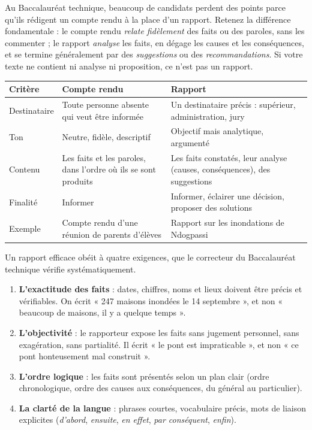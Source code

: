 \documentclass[11pt]{article}
\newcommand{\cle}[1]{{\popxbold\color{popdark}#1}}
\newcounter{popsec}
\newcounter{popsub}
\newcommand{\courssub}[1]{%
  \stepcounter{popsub}%
  \par\vspace{9pt}\noindent{\popxbold\fontsize{11.5}{13}\selectfont\color{popink}{\color{poporange}\thepopsec.\thepopsub}\hspace{6pt}#1}\par\nopagebreak\vspace{4pt}
}
\begin{document}
\begin{attention}
Au Baccalauréat technique, beaucoup de candidats perdent des points parce qu'ils rédigent un compte rendu à la place d'un rapport. Retenez la différence fondamentale : le \cle{compte rendu} \emph{relate fidèlement} des faits ou des paroles, sans les commenter ; le \cle{rapport} \emph{analyse} les faits, en dégage les causes et les conséquences, et se termine généralement par des \emph{suggestions} ou des \emph{recommandations}. Si votre texte ne contient ni analyse ni proposition, ce n'est pas un rapport.
\end{attention}

\begin{center}
\begin{tabularx}{\linewidth}{|l|X|X|}\hline
\rowcolor{popblueL} \textbf{Critère} & \textbf{Compte rendu} & \textbf{Rapport} \\ \hline
Destinataire & Toute personne absente qui veut être informée & Un destinataire précis : supérieur, administration, jury \\ \hline
Ton & Neutre, fidèle, descriptif & Objectif mais analytique, argumenté \\ \hline
Contenu & Les faits et les paroles, dans l'ordre où ils se sont produits & Les faits constatés, leur analyse (causes, conséquences), des suggestions \\ \hline
Finalité & Informer & Informer, éclairer une décision, proposer des solutions \\ \hline
Exemple & Compte rendu d'une réunion de parents d'élèves & Rapport sur les inondations de Ndogpassi \\ \hline
\end{tabularx}
\end{center}

\courssub{Les qualités d'un bon rapport}

Un rapport efficace obéit à quatre exigences, que le correcteur du Baccalauréat technique vérifie systématiquement.

\begin{propriete}
\begin{enumerate}
\item \textbf{L'exactitude des faits} : dates, chiffres, noms et lieux doivent être précis et vérifiables. On écrit « 247 maisons inondées le 14 septembre », et non « beaucoup de maisons, il y a quelque temps ».
\item \textbf{L'objectivité} : le rapporteur expose les faits sans jugement personnel, sans exagération, sans partialité. Il écrit « le pont est impraticable », et non « ce pont honteusement mal construit ».
\item \textbf{L'ordre logique} : les faits sont présentés selon un plan clair (ordre chronologique, ordre des causes aux conséquences, du général au particulier).
\item \textbf{La clarté de la langue} : phrases courtes, vocabulaire précis, mots de liaison explicites (\emph{d'abord}, \emph{ensuite}, \emph{en effet}, \emph{par conséquent}, \emph{enfin}).
\end{enumerate}
\end{propriete}
\end{document}
